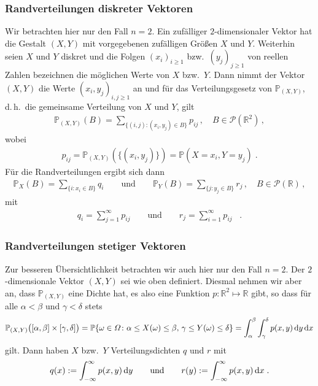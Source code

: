 \documentclass[ngerman,draft,parskip=half,twoside]{scrartcl}
\newcommand*{\R}{\mathbb{R}}      %
\newcommand*{\PotM}{\mathcal{P}}    %
\newcommand*{\WKM}{\mathbb{P}}      %
\newcommand*{\diff}[1]{%
  \mathop{\mathrm{\mathstrut d}}%
  \ifx#1(\else%
  \ifx#1[\else%
  \ifx#1\{\else%
    \!%
  \fi\fi\fi#1%
}
\begin{document}
\subsubsection{Randverteilungen diskreter Vektoren}
\label{disk}
Wir betrachten hier nur den Fall $n=2$. Ein zufälliger $2$-dimensionaler Vektor hat die Gestalt
$(X,Y)$ mit vorgegebenen zufälligen Größen $X$ und $Y$. Weiterhin seien $X$ und $Y$ diskret und die
Folgen
$(x_i)_{i\ge 1}$ bzw.~$(y_j)_{j\ge 1}$ von reellen Zahlen bezeichnen  die möglichen Werte von $X$ bzw.~$Y$.
Dann nimmt der Vektor $(X,Y)$ die Werte $(x_i,y_j)_{i,j\ge 1}$ an und für das Verteilungsgesetz
von $\WKM_{(X,Y)}$, d.\,h.~die gemeinsame Verteilung von $X$ und $Y$, gilt
\begin{gather*}
  \WKM_{(X,Y)}(B)=\sum_{\{(i,j)\colon (x_i,y_j)\in B\}} p_{ij}\,,\quad B\in\PotM(\R^2)\,,
\end{gather*}
wobei
\begin{gather*}
  p_{ij}= \WKM_{(X,Y)}(\{(x_i,y_j)\})=\WKM(X=x_i,Y=y_j)\;.
\end{gather*}
Für die Randverteilungen ergibt sich dann
\begin{gather*}
  \WKM_X(B)=\sum_{\{i\colon x_i\in B\}} q_i \qquad\mbox{und}\qquad
     \WKM_Y(B)=\sum_{\{j\colon y_j\in B\}} r_j\,,\quad B\in\PotM(\R)\,,
\end{gather*}
mit
\begin{gather*}
  q_i=\sum_{j=1}^\infty p_{ij}\qquad\mbox{und}\qquad r_j=\sum_{i=1}^\infty p_{ij}\;\;\;.
\end{gather*}
\subsubsection{Randverteilungen stetiger Vektoren}
\label{stet}
Zur besseren Übersichtlichkeit betrachten wir auch hier nur den Fall $n=2$. Der
$2$-dimensionale Vektor $(X,Y)$ sei wie oben definiert. Diesmal nehmen wir aber an, dass
$\WKM_{(X,Y)}$ eine Dichte hat, es also eine Funktion $p \colon\R^2\mapsto\R$ gibt, so
dass für alle $\alpha<\beta$ und $\gamma<\delta$ stets
\begin{gather*}
  \WKM_{(X,Y)}\big([\alpha,\beta]\times[\gamma,\delta]\big)
     =\WKM\{\omega\in \Omega \colon \alpha\le X(\omega)\le\beta,\,\gamma\le Y(\omega)\le\delta\}
     =\int_\alpha^\beta\int_\gamma^\delta p(x,y)\diff{y} \diff{x}
\end{gather*}
gilt. Dann haben $X$ bzw.~$Y$ Verteilungsdichten $q$ und $r$ mit
\begin{gather*}
  q(x):=\int_{-\infty}^\infty p(x,y)\diff{y}\qquad\mbox{und}\qquad
     r(y):=\int_{-\infty}^\infty p(x,y)\diff{x}\;.
\end{gather*}
\end{document}
